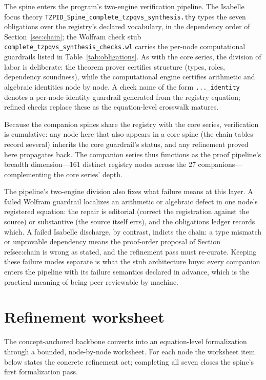 \documentclass[11pt]{article}
\theoremstyle{remark}
\begin{document}
The spine enters the program's two-engine verification pipeline. The Isabelle focus theory \texttt{TZPID\_Spine\_complete\_tzpqvs\_synthesis.thy} types the seven obligations over the registry's declared vocabulary, in the dependency order of Section~\ref{sec:chain}; the Wolfram check stub \texttt{complete\_tzpqvs\_synthesis\_checks.wl} carries the per-node computational guardrails listed in Table~\ref{tab:obligations}. As with the core series, the division of labor is deliberate: the theorem prover certifies structure (types, roles, dependency soundness), while the computational engine certifies arithmetic and algebraic identities node by node. A check name of the form \texttt{...\_identity} denotes a per-node identity guardrail generated from the registry equation; refined checks replace these as the equation-level crosswalk matures.

Because the companion spines share the registry with the core series, verification is cumulative: any node here that also appears in a core spine (the chain tables record several) inherits the core guardrail's status, and any refinement proved here propagates back. The companion series thus functions as the proof pipeline's breadth dimension---161 distinct registry nodes across the 27 companions---complementing the core series' depth.

The pipeline's two-engine division also fixes what failure means at this layer. A failed Wolfram guardrail localizes an arithmetic or algebraic defect in one node's registered equation: the repair is editorial (correct the registration against the source) or substantive (the source itself errs), and the obligations ledger records which. A failed Isabelle discharge, by contrast, indicts the chain: a type mismatch or unprovable dependency means the proof-order proposal of Section~\\ref{sec:chain} is wrong as stated, and the refinement pass must re-curate. Keeping these failure modes separate is what the stub architecture buys: every companion enters the pipeline with its failure semantics declared in advance, which is the practical meaning of being peer-reviewable by machine.

\section{Refinement worksheet}
\label{sec:worksheet}

The concept-anchored backbone converts into an equation-level formalization through a bounded, node-by-node worksheet. For each node the worksheet item below states the concrete refinement act; completing all seven closes the spine's first formalization pass.
\end{document}
